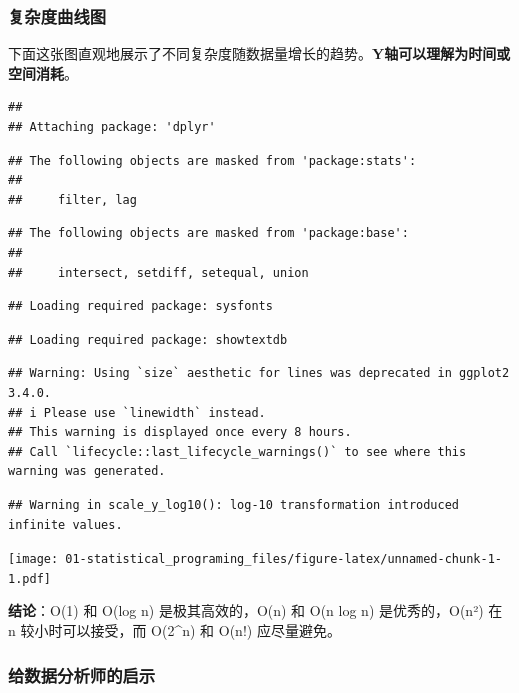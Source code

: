 \documentclass[
  twoside]{book}
\begin{document}
\hypertarget{ux590dux6742ux5ea6ux66f2ux7ebfux56fe}{%
\subsubsection{复杂度曲线图}\label{ux590dux6742ux5ea6ux66f2ux7ebfux56fe}}

下面这张图直观地展示了不同复杂度随数据量增长的趋势。\textbf{Y轴可以理解为时间或空间消耗}。

\begin{verbatim}
## 
## Attaching package: 'dplyr'
\end{verbatim}

\begin{verbatim}
## The following objects are masked from 'package:stats':
## 
##     filter, lag
\end{verbatim}

\begin{verbatim}
## The following objects are masked from 'package:base':
## 
##     intersect, setdiff, setequal, union
\end{verbatim}

\begin{verbatim}
## Loading required package: sysfonts
\end{verbatim}

\begin{verbatim}
## Loading required package: showtextdb
\end{verbatim}

\begin{verbatim}
## Warning: Using `size` aesthetic for lines was deprecated in ggplot2 3.4.0.
## i Please use `linewidth` instead.
## This warning is displayed once every 8 hours.
## Call `lifecycle::last_lifecycle_warnings()` to see where this warning was generated.
\end{verbatim}

\begin{verbatim}
## Warning in scale_y_log10(): log-10 transformation introduced infinite values.
\end{verbatim}

\texttt{[image: 01-statistical\_programing\_files/figure-latex/unnamed-chunk-1-1.pdf]}

\textbf{结论}：O(1) 和 O(log n) 是极其高效的，O(n) 和 O(n log n) 是优秀的，O(n²) 在 n 较小时可以接受，而 O(2\^{}n) 和 O(n!) 应尽量避免。

\hypertarget{ux7ed9ux6570ux636eux5206ux6790ux5e08ux7684ux542fux793a}{%
\subsubsection{给数据分析师的启示}\label{ux7ed9ux6570ux636eux5206ux6790ux5e08ux7684ux542fux793a}}
\end{document}
